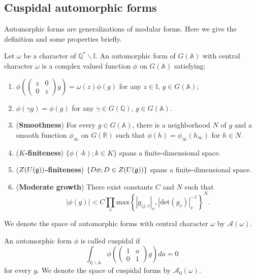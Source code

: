 \subsection{Cuspidal automorphic forms}

Automorphic forms are generalizations of modular forms. Here we give the definition and some properties briefly.

\begin{definition}
Let $\omega$ be a character of $ \mathbb Q^*\backslash  \mathbb I$. An automorphic form of $G(\mathbb A)$ with central character $\omega$ is a complex valued function $\phi$ on $G(\mathbb A)$ satisfying:
\begin{enumerate}
\item  $\phi\left(\left (\begin{array}{cc}
z & 0\\
0 & z
\end{array} \right )g\right )=\omega(z)\phi(g)$ for any $z\in \mathbb I$, $g\in G(\mathbb A)$;
\item  $\phi(\gamma g)=\phi(g)$ for any $\gamma\in G(\mathbb Q)$, $g\in G(\mathbb A)$.\\
\item  (\textbf{Smoothness}) For every $g\in G(\mathbb A)$, there is a neighborhood $N$ of $g$ and a smooth function $\phi_\infty$ on $G(\mathbb R)$ such that $\phi(h)=\phi_\infty(h_\infty)$ for $h\in N$.
\item  (\textbf{$K$-finiteness}) $\{\phi(\cdot k); k\in K\}$ spans a finite-dimensional space.
\item  (\textbf{$Z(U(\mathfrak g))$-finiteness}) $\{D\phi; D\in Z(U(\mathfrak g))\}$ spans a finite-dimensional space.
\item  (\textbf{Moderate growth}) There exist constants $C$ and $N$ such that
\[\left |\phi(g) \right |< C\prod _v \mathrm {max}\left \{ \left |g_{ij,v}\right |_v, \left |\mathrm {det} (g_v) \right |^{-1}_v\right \}^N.\]
\end{enumerate}
We denote the space of automorphic forms with central character $\omega$ by $\mathcal A(\omega)$.
\end{definition}

\begin{definition}\label{CAF}
An automorphic form $\phi$ is called cuspidal if
\begin{equation}\label{cuspidal}
\int _{\mathbb Q\backslash \mathbb A}\phi\left ( \left (\begin{array}{cc}
1 & a\\
0 & 1
\end{array} \right )g\right )da=0
\end{equation}
for every $g$. We denote the space of cuspidal forms by $\mathcal A_0(\omega)$.
\end{definition}


